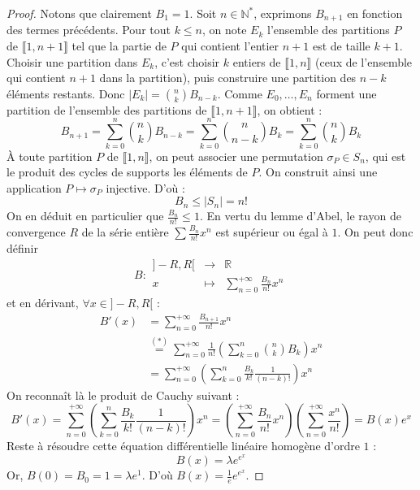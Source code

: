   \begin{proof}
    Notons que clairement $B_1 = 1$. Soit $n \in \mathbb{N}^*$, exprimons $B_{n+1}$ en fonction des termes précédents. Pour tout $k \leq n$, on note $E_k$ l'ensemble des partitions $P$ de $\llbracket 1, n+1 \rrbracket$ tel que la partie de $P$ qui contient l'entier $n+1$ est de taille $k+1$. Choisir une partition dans $E_k$, c'est choisir $k$ entiers de $\llbracket 1, n \rrbracket$ (ceux de l'ensemble qui contient $n+1$ dans la partition), puis construire une partition des $n-k$ éléments restants. Donc $|E_k| = \binom{n}{k} B_{n-k}$.
    \newpar
    Comme $E_0, \dots, E_n$ forment une partition de l'ensemble des partitions de $\llbracket 1, n+1 \rrbracket$, on obtient :
    \[ B_{n+1} = \sum_{k=0}^n \binom{n}{k} B_{n-k} = \sum_{k=0}^n \binom{n}{n-k} B_k = \sum_{k=0}^n \binom{n}{k} B_k \tag{$*$} \]
    À toute partition $P$ de $\llbracket 1, n \rrbracket$, on peut associer une permutation $\sigma_P \in S_n$, qui est le produit des cycles de supports les éléments de $P$. On construit ainsi une application $P \mapsto \sigma_P$ injective. D'où :
    \[ B_n \leq |S_n| = n! \]
    On en déduit en particulier que $\frac{B_n}{n!} \leq 1$. En vertu du lemme d'Abel, le rayon de convergence $R$ de la série entière $\sum \frac{B_n}{n!} x^n$ est supérieur ou égal à $1$. On peut donc définir
    \[
    B :
    \begin{array}{ccc}
      ]-R,R[ &\rightarrow& \mathbb{R} \\
      x &\mapsto& \sum_{n=0}^{+\infty} \frac{B_n}{n!} x^n
    \end{array}
    \]
    et en dérivant, $\forall x \in ]-R,R[$ :
    \begin{align*}
      B'(x) &= \sum_{n=0}^{+\infty} \frac{B_{n+1}}{n!} x^n \\
      &\overset{(*)}{=} \sum_{n=0}^{+\infty} \frac{1}{n!} \left( \sum_{k=0}^n \binom{n}{k} B_k \right) x^n \\
      &= \sum_{n=0}^{+\infty} \left( \sum_{k=0}^n \frac{B_k}{k!} \frac{1}{(n-k)!} \right) x^n
    \end{align*}
    On reconnaît là le produit de Cauchy suivant :
    \[ B'(x) = \sum_{n=0}^{+\infty} \left( \sum_{k=0}^n \frac{B_k}{k!} \frac{1}{(n-k)!} \right) x^n = \left( \sum_{n=0}^{+\infty} \frac{B_n}{n!} x^n \right) \left( \sum_{n=0}^{+\infty} \frac{x^n}{n!} \right) = B(x) e^x \]
    Reste à résoudre cette équation différentielle linéaire homogène d'ordre $1$ :
    \[ B(x) = \lambda e^{e^x} \]
    Or, $B(0) = B_0 = 1 = \lambda e^1$. D'où $B(x) = \frac{1}{e} e^{e^x}$.

\end{proof}

